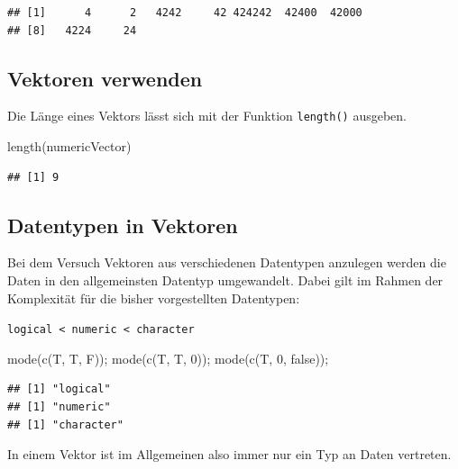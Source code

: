 \documentclass[
]{book}
\newenvironment{Shaded}{\begin{snugshade}}{\end{snugshade}}
\newcommand{\DecValTok}[1]{\textcolor[rgb]{0.00,0.00,0.81}{#1}}
\newcommand{\FunctionTok}[1]{\textcolor[rgb]{0.00,0.00,0.00}{#1}}
\newcommand{\NormalTok}[1]{#1}
\newcommand{\StringTok}[1]{\textcolor[rgb]{0.31,0.60,0.02}{#1}}
\begin{document}
\begin{verbatim}
## [1]      4      2   4242     42 424242  42400  42000
## [8]   4224     24
\end{verbatim}

\hypertarget{vektoren-verwenden}{%
\subsection{Vektoren verwenden}\label{vektoren-verwenden}}

Die Länge eines Vektors lässt sich mit der Funktion \texttt{length()} ausgeben.

\begin{Shaded}
\begin{Highlighting}[]
\FunctionTok{length}\NormalTok{(numericVector)}
\end{Highlighting}
\end{Shaded}

\begin{verbatim}
## [1] 9
\end{verbatim}

\hypertarget{datentypen-in-vektoren}{%
\subsection{Datentypen in Vektoren}\label{datentypen-in-vektoren}}

Bei dem Versuch Vektoren aus verschiedenen Datentypen anzulegen werden die Daten in den allgemeinsten Datentyp umgewandelt. Dabei gilt im Rahmen der Komplexität für die bisher vorgestellten Datentypen:

\texttt{logical\ \textless{}\ numeric\ \textless{}\ character}

\begin{Shaded}
\begin{Highlighting}[]
\FunctionTok{mode}\NormalTok{(}\FunctionTok{c}\NormalTok{(T, T, F));}
\FunctionTok{mode}\NormalTok{(}\FunctionTok{c}\NormalTok{(T, T, }\DecValTok{0}\NormalTok{));}
\FunctionTok{mode}\NormalTok{(}\FunctionTok{c}\NormalTok{(T, }\DecValTok{0}\NormalTok{, }\StringTok{\textquotesingle{}false\textquotesingle{}}\NormalTok{));}
\end{Highlighting}
\end{Shaded}

\begin{verbatim}
## [1] "logical"
## [1] "numeric"
## [1] "character"
\end{verbatim}

In einem Vektor ist im Allgemeinen also immer nur ein Typ an Daten vertreten.
\end{document}
